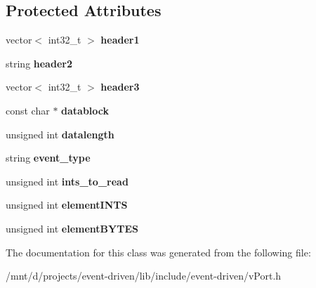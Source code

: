 \subsection*{Protected Attributes}
\begin{DoxyCompactItemize}
\item 
\mbox{\label{classev_1_1vPortableInterface_aa6963fbd9f86d0c12b1cec3f50154039}} 
vector$<$ int32\+\_\+t $>$ {\bfseries header1}
\item 
\mbox{\label{classev_1_1vPortableInterface_aacd6a1f6ca7e75d8b56fb00bdab93115}} 
string {\bfseries header2}
\item 
\mbox{\label{classev_1_1vPortableInterface_a4c8644690c45885728ccded09831b907}} 
vector$<$ int32\+\_\+t $>$ {\bfseries header3}
\item 
\mbox{\label{classev_1_1vPortableInterface_a4e3377c27147a1dd9364a9c01a9433a3}} 
const char $\ast$ {\bfseries datablock}
\item 
\mbox{\label{classev_1_1vPortableInterface_afb56f5c3c78e2029796cc8e3633c7fb1}} 
unsigned int {\bfseries datalength}
\item 
\mbox{\label{classev_1_1vPortableInterface_a74417dedd31327a04fcb03f9c5362651}} 
string {\bfseries event\+\_\+type}
\item 
\mbox{\label{classev_1_1vPortableInterface_a9f1790f33d34109839ad9845dffb6e77}} 
unsigned int {\bfseries ints\+\_\+to\+\_\+read}
\item 
\mbox{\label{classev_1_1vPortableInterface_a66759f62e93cdb2e6b82595f486de0ca}} 
unsigned int {\bfseries element\+I\+N\+TS}
\item 
\mbox{\label{classev_1_1vPortableInterface_a1aff2a4a19957a3d28c9981506f65128}} 
unsigned int {\bfseries element\+B\+Y\+T\+ES}
\end{DoxyCompactItemize}


The documentation for this class was generated from the following file\+:\begin{DoxyCompactItemize}
\item 
/mnt/d/projects/event-\/driven/lib/include/event-\/driven/v\+Port.\+h\end{DoxyCompactItemize}
